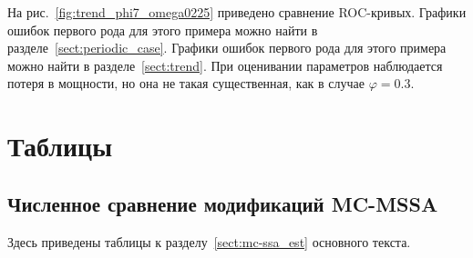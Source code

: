 \documentclass[specialist,
substylefile = spbu.rtx,
               subf,href,colorlinks=true,12pt]{disser}
\theoremstyle{definition}
\begin{document}
На рис.~\ref{fig:trend_phi7_omega0225} приведено сравнение ROC-кривых. Графики ошибок первого рода для этого примера можно найти в разделе~\ref{sect:periodic_case}. Графики ошибок первого рода для этого примера можно найти в разделе~\ref{sect:trend}. При оценивании параметров наблюдается потеря в мощности, но она не такая существенная, как в случае $\varphi=0.3$.

\chapter{Таблицы}
\section{Численное сравнение модификаций MC-MSSA}\label{appendix:mc-mssa_tables}
Здесь приведены таблицы к разделу~\ref{sect:mc-ssa_est} основного текста.
\end{document}
